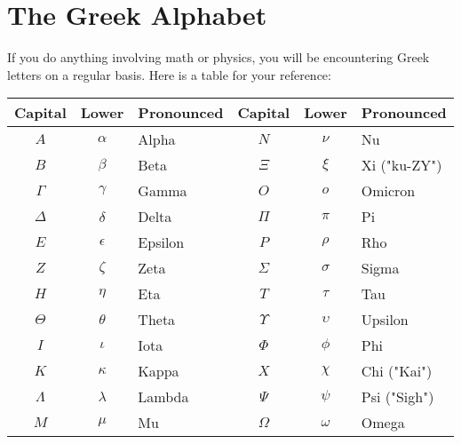\chapter{The Greek Alphabet}

If you do anything involving math or physics, you will be encountering Greek letters on a regular basis. Here is a table for your reference:

\begin{tabular}{c c  l | c c l}
Capital & Lower & Pronounced & Capital & Lower & Pronounced\\
\hline
$A$ & $\alpha$ & Alpha & $N$ & $\nu$ & Nu\\
$B$ & $\beta$ & Beta & $\Xi$ & $\xi$ & Xi ("ku-ZY") \\
$\Gamma$ & $\gamma$ & Gamma & $O$ & $o$ & Omicron\\
$\Delta$ & $\delta$ & Delta & $\Pi$ & $\pi$ & Pi\\
$E$ & $\epsilon$ & Epsilon & $P$ & $\rho$ & Rho\\
$Z$ & $\zeta$ & Zeta & $\Sigma$ & $\sigma$ & Sigma\\
$H$ & $\eta$ & Eta & $T$ & $\tau$ & Tau\\
$\Theta$ & $\theta$ & Theta & $\Upsilon$ & $\upsilon$ & Upsilon\\
$I$ & $\iota$ & Iota & $\Phi$ & $\phi$ & Phi\\
$K$ & $\kappa$ & Kappa & $X$ & $\chi$ & Chi ("Kai")\\
$\Lambda$ & $\lambda$ & Lambda & $\Psi$ & $\psi$ & Psi ("Sigh")\\
$M$ & $\mu$ & Mu & $\Omega$ & $\omega$ & Omega
\end{tabular}